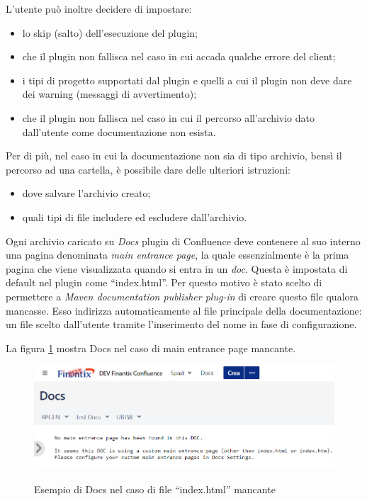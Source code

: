 

	L'utente può inoltre decidere di impostare:
	\begin{itemize}
		\item lo skip (salto) dell'esecuzione del plugin;
		\item che il plugin non fallisca nel caso in cui accada qualche errore del client;
		\item i tipi di progetto supportati dal plugin e quelli a cui il plugin non deve dare dei warning (messaggi di avvertimento);
		\item che il plugin non fallisca nel caso in cui il percorso all'archivio dato dall'utente come documentazione non esista.
	\end{itemize}

	Per di più, nel caso in cui la documentazione non sia di tipo archivio, bensì il percorso ad una cartella, è possibile dare delle ulteriori istruzioni:
	\begin{itemize}
		\item dove salvare l'archivio creato;
		\item quali tipi di file includere ed escludere dall'archivio.
	\end{itemize}

	Ogni archivio caricato su \emph{Docs} plugin di Confluence deve contenere al suo interno una pagina denominata \emph{main entrance page}, la quale essenzialmente è la prima pagina che viene visualizzata quando si entra in un \emph{doc}.
	Questa è impostata di default nel plugin come ``index.html''.
	Per questo motivo è stato scelto di permettere a \emph{Maven documentation publisher plug-in} di creare questo file qualora mancasse.
	Esso indirizza automaticamente al file principale della documentazione: un file scelto dall'utente tramite l'inserimento del nome in fase di configurazione.

	La figura \ref{errorDocs} mostra Docs nel caso di main entrance page mancante.

	\begin{figure}[H]
		\centering
		\includegraphics[width=\textwidth]{immagini/indexError.png}\\
		\caption{Esempio di Docs nel caso di file ``index.html'' mancante}
		\label{errorDocs}
	\end{figure}


